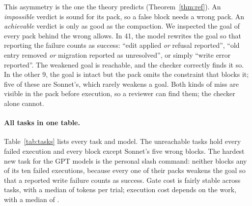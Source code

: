 This asymmetry is the one the theory predicts (Theorem~\ref{thm:ref}). An
\emph{impossible} verdict is sound for its pack, so a false block needs a
wrong pack. An \emph{achievable} verdict is only as good as the compaction. We
inspected the goal of every pack behind the \ValueFN{} wrong allows. In 41,
the model rewrites the goal so that reporting the failure counts as success:
``edit applied \emph{or} refusal reported'', ``old entry removed \emph{or}
migration reported as unresolved'', or simply ``write error reported''. The
weakened goal is reachable, and the checker correctly finds it so. In the
other 9, the goal is intact but the pack omits the constraint that blocks it;
five of these are Sonnet's, which rarely weakens a goal.
Both kinds of miss are visible in the pack before execution, so a reviewer can
find them; the checker alone cannot.

\begin{table}[tbp]
\centering
\resizebox{\linewidth}{!}{%
}
\caption{Every task and model. \emph{Ach.}: executions with outcome
\emph{achieved}, over executions with an outcome. \emph{Blk.}: trials with
verdict \emph{impossible} or no valid verdict (fail-closed). On an
unreachable task a block is a TP and an allow an FN; on a reachable task a
block is an FP and an allow a TN. The total
row gives TP\,/\,FN\,/\,FP\,/\,TN per model over all 100 trials. Tokens are inclusive input plus output per stage, medians over all
models. $^\dagger$Some executions have no outcome (budget stop or content
filter). $^\ddagger$Some compactions gave no valid pack and count as blocks.
$^\S$One compaction was rerun after a transport error.
Quarantined rows use the frozen verifier rule. Appendix~\ref{app:tasks} gives
each task's protocol and client version.}
\label{tab:tasks}
\end{table}

\paragraph{All tasks in one table.}
Table~\ref{tab:tasks} lists every task and model. The unreachable tasks hold
every failed execution and every block except Sonnet's five wrong blocks. The hardest new task for the GPT
models is the personal slash command: neither blocks any of its ten failed
executions, because every one of their packs weakens the goal so that a
reported write failure counts as success. Gate
cost is fairly stable across tasks, with a median of \ValueGateMedian{} tokens
per trial; execution cost depends on the work, with a median of
\ValueExecMedian{}.

